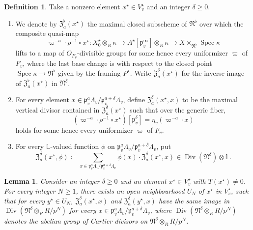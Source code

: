 \documentclass[12pt]{amsart}
\numberwithin{equation}{section}
\theoremstyle{plain}
\newtheorem{lem}[proposition]{Lemma}
\theoremstyle{definition}
\newtheorem{definition}[proposition]{Definition}
\theoremstyle{remark}
\renewcommand{\d}[1]{\mathbb{#1}}
\newcommand{\f}[1]{\mathfrak{#1}}
\renewcommand{\(}{\left(}
\renewcommand{\)}{\right)}
\renewcommand{\geq}{\geqslant}
\newcommand{\dL}{\d L}
\newcommand{\fN}{\f N}
\newcommand{\fZ}{\f Z}
\newcommand{\fp}{\f p}
\DeclareMathOperator{\Div}{Div}
\DeclareMathOperator{\Spec}{Spec}
\begin{document}
\begin{definition}\label{de:special_cycle_formal}
Take a nonzero element $x^\star\in V^\star_v$ and an integer $\delta\geq 0$.
\begin{enumerate}
  \item We denote by $\fZ_a^\flat(x^\star)$ the maximal closed subscheme of $\fN^\flat$ over which the composite quasi-map
      \[
      \varpi^{-a}\cdot\rho^{-1}\circ x^\star\colon X^\star_0\otimes_R\kappa \to A^\star[\fp_v^\infty]\otimes_R\kappa \to  X\times_{\fN^\flat}\Spec\kappa
      \]
      lifts to a map of $O_{F_v}$-divisible groups for some hence every uniformizer $\varpi$ of $F_v$, where the last base change is with respect to the closed point $\Spec\kappa\to\fN^\flat$ given by the framing $P^\star$. Write $\fZ_a^\delta(x^\star)$ for the inverse image of $\fZ_a^\flat(x^\star)$ in $\fN^\delta$.

  \item For every element $x\in\fp_v^a\Lambda_v/\fp_v^{a+\delta}\Lambda_v$, define $\fZ_a^\delta(x^\star,x)$ to be the maximal vertical divisor contained in $\fZ_a^\delta(x^\star)$ such that over the generic fiber,
      \[
      (\varpi^{-a}\cdot\rho^{-1}\circ x^\star)[\fp_v^\delta]=\eta_v(\varpi^{-a}\cdot x)
      \]
      holds for some hence every uniformizer $\varpi$ of $F_v$.

  \item For every $\dL$-valued function $\phi$ on $\fp_v^a\Lambda_v/\fp_v^{a+\delta}\Lambda_v$, put
      \[
      \fZ_a^\delta(x^\star,\phi)\coloneqq\sum_{x\in\fp_v^a\Lambda_v/\fp_v^{a+\delta}\Lambda_v}\phi(x)\cdot\fZ_a^\delta(x^\star,x)
      \in\Div(\fN^\delta)\otimes\dL.
      \]
\end{enumerate}
\end{definition}



\begin{lem}\label{le:special_divisor_formal}
Consider an integer $\delta\geq0$ and an element $x^\star\in V^\star_v$ with $T(x^\star)\neq 0$. For every integer $N\geq 1$, there exists an open neighbourhood $U_N$ of $x^\star$ in $V^\star_v$, such that for every $y^\star\in U_N$, $\fZ_a^\delta(x^\star,x)$ and $\fZ_a^\delta(y^\star,x)$ have the same image in $\Div(\fN^\delta\otimes_RR/p^N)$ for every $x\in\fp_v^a\Lambda_v/\fp_v^{a+\delta}\Lambda_v$, where $\Div(\fN^\delta\otimes_RR/p^N)$ denotes the abelian group of Cartier divisors on $\fN^\delta\otimes_RR/p^N$.
\end{lem}
\end{document}
